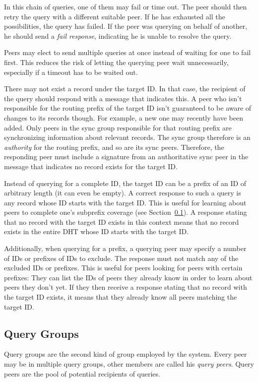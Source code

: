In this chain of queries, one of them may fail or time out. The peer should then
retry the query with a different suitable peer. If he has exhausted all the
possibilities, the query has failed. If the peer was querying on behalf of
another, he should send a \emph{fail response}, indicating he is unable to
resolve the query.

Peers may elect to send multiple queries at once instead of waiting for one to
fail first. This reduces the risk of letting the querying peer wait
unnecessarily, especially if a timeout has to be waited out.

There may not exist a record under the target ID. In that case, the recipient of
the query should respond with a message that indicates this. A peer who isn't
responsible for the routing prefix of the target ID isn't guaranteed to be aware
of changes to its records though. For example, a new one may recently have been
added. Only peers in the sync group responsible for that routing prefix are
synchronizing information about relevant records. The sync group therefore is an
\emph{authority} for the routing prefix, and so are its sync peers. Therefore,
the responding peer must include a signature from an authoritative sync peer in
the message that indicates no record exists for the target ID.

Instead of querying for a complete ID, the target ID can be a prefix of an ID of
arbitrary length (it can even be empty). A correct response to such a query is
any record whose ID starts with the target ID. This is useful for learning about
peers to complete one's subprefix coverage (see
Section~\ref{sec:desc_query_groups}). A response stating that no record with the
target ID exists in this context means that no record exists in the entire DHT
whose ID starts with the target ID.

Additionally, when querying for a prefix, a querying peer may specify a number
of IDs or prefixes of IDs to exclude. The response must not match any of the
excluded IDs or prefixes. This is useful for peers looking for peers with
certain prefixes: They can list the IDs of peers they already know in order to
learn about peers they don't yet. If they then receive a response stating that
no record with the target ID exists, it means that they already know all peers
matching the target ID.

\subsection{Query Groups}
\label{sec:desc_query_groups}
Query groups are the second kind of group employed by the system. Every peer may
be in multiple query groups, other members are called his \emph{query peers}.
Query peers are the pool of potential recipients of queries.

